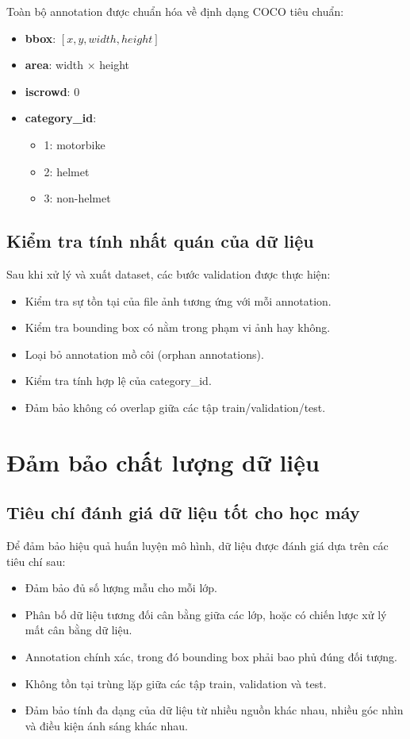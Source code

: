 Toàn bộ annotation được chuẩn hóa về định dạng COCO tiêu chuẩn:

\begin{itemize}
    \item \textbf{bbox}: \([x, y, width, height]\)
    \item \textbf{area}: width $\times$ height
    \item \textbf{iscrowd}: 0
    \item \textbf{category\_id}:
    \begin{itemize}
        \item 1: motorbike
        \item 2: helmet
        \item 3: non-helmet
    \end{itemize}
\end{itemize}

\subsection{Kiểm tra tính nhất quán của dữ liệu}

Sau khi xử lý và xuất dataset, các bước validation được thực hiện:

\begin{itemize}
    \item Kiểm tra sự tồn tại của file ảnh tương ứng với mỗi annotation.
    \item Kiểm tra bounding box có nằm trong phạm vi ảnh hay không.
    \item Loại bỏ annotation mồ côi (orphan annotations).
    \item Kiểm tra tính hợp lệ của category\_id.
    \item Đảm bảo không có overlap giữa các tập train/validation/test.
\end{itemize}

\section{Đảm bảo chất lượng dữ liệu}

\subsection{Tiêu chí đánh giá dữ liệu tốt cho học máy}

Để đảm bảo hiệu quả huấn luyện mô hình, dữ liệu được đánh giá dựa trên các tiêu chí sau:

\begin{itemize}
    \item Đảm bảo đủ số lượng mẫu cho mỗi lớp.
    \item Phân bố dữ liệu tương đối cân bằng giữa các lớp, hoặc có chiến lược xử lý mất cân bằng dữ liệu.
    \item Annotation chính xác, trong đó bounding box phải bao phủ đúng đối tượng.
    \item Không tồn tại trùng lặp giữa các tập train, validation và test.
    \item Đảm bảo tính đa dạng của dữ liệu từ nhiều nguồn khác nhau, nhiều góc nhìn và điều kiện ánh sáng khác nhau.
\end{itemize}

